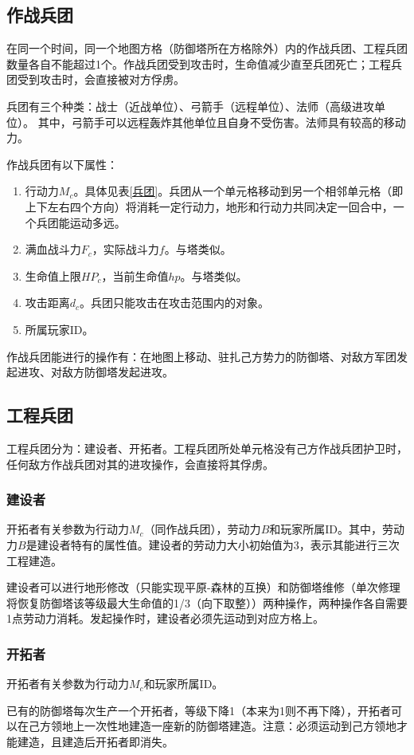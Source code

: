 \documentclass[a4paper,4pt]{article}
\begin{document}
\subsection{作战兵团}
在同一个时间，同一个地图方格（防御塔所在方格除外）内的作战兵团、工程兵团数量各自不能超过1个。作战兵团受到攻击时，生命值减少直至兵团死亡；工程兵团受到攻击时，会直接被对方俘虏。\par
兵团有三个种类：战士（近战单位）、弓箭手（远程单位）、法师（高级进攻单位）。
其中，弓箭手可以远程轰炸其他单位且自身不受伤害。法师具有较高的移动力。\par
作战兵团有以下属性：
\begin{enumerate}[fullwidth, itemindent=2em, label=(\arabic*)]
  \item 行动力$M_c$。具体见表\ref{兵团}。兵团从一个单元格移动到另一个相邻单元格（即上下左右四个方向）将消耗一定行动力，地形和行动力共同决定一回合中，一个兵团能运动多远。
  \item 满血战斗力$F_c$，实际战斗力$f$。与塔类似。
  \item 生命值上限$HP_c$，当前生命值$hp$。与塔类似。
  \item 攻击距离$d_c$。兵团只能攻击在攻击范围内的对象。
  \item 所属玩家ID。
\end{enumerate}
\par
作战兵团能进行的操作有：在地图上移动、驻扎己方势力的防御塔、对敌方军团发起进攻、对敌方防御塔发起进攻。


\subsection{工程兵团}
工程兵团分为：建设者、开拓者。工程兵团所处单元格没有己方作战兵团护卫时，任何敌方作战兵团对其的进攻操作，会直接将其俘虏。\par

\subsubsection{建设者}
开拓者有关参数为行动力$M_c$（同作战兵团），劳动力$B$和玩家所属ID。其中，劳动力$B$是建设者特有的属性值。建设者的劳动力大小初始值为3，表示其能进行三次工程建造。\par %
建设者可以进行地形修改（只能实现平原-森林的互换）和防御塔维修（单次修理将恢复防御塔该等级最大生命值的1/3（向下取整））两种操作，两种操作各自需要1点劳动力消耗。发起操作时，建设者必须先运动到对应方格上。
\subsubsection{开拓者}
开拓者有关参数为行动力$M_c$和玩家所属ID。\par
已有的防御塔每次生产一个开拓者，等级下降1（本来为1则不再下降），开拓者可以在己方领地上一次性地建造一座新的防御塔建造。注意：必须运动到己方领地才能建造，且建造后开拓者即消失。
\end{document}
